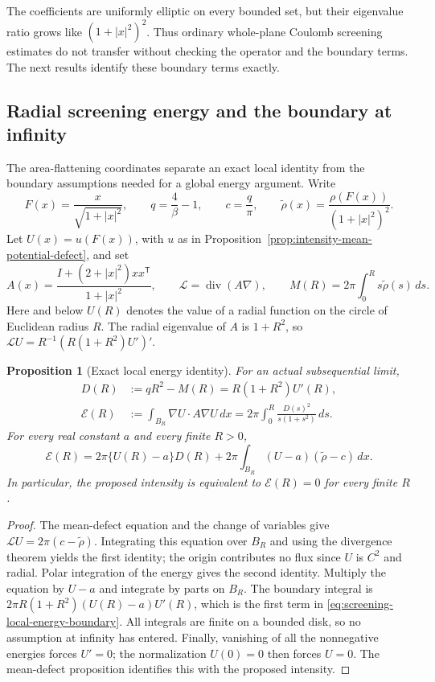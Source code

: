 \documentclass[11pt,a4paper]{article}
\numberwithin{equation}{section}
\newtheorem{proposition}[theorem]{Proposition}
\theoremstyle{definition}
\theoremstyle{remark}
\begin{document}
The coefficients are uniformly elliptic on every bounded set, but
their eigenvalue ratio grows like $(1+|x|^2)^2$.  Thus ordinary
whole-plane Coulomb screening estimates do not transfer without
checking the operator and the boundary terms.  The next results
identify these boundary terms exactly.


\subsection{Radial screening energy and the boundary at infinity}
\label{subsec:screening-boundary-energy}

The area-flattening coordinates separate an exact local identity from
the boundary assumptions needed for a global energy argument.  Write
\[
 F(x)=\frac{x}{\sqrt{1+|x|^2}},\qquad
 q=\frac4\beta-1,\qquad c=\frac q\pi,
 \qquad \widetilde\rho(x)=\frac{\rho(F(x))}{(1+|x|^2)^2}.
\]
Let $U(x)=u(F(x))$, with $u$ as in
Proposition~\ref{prop:intensity-mean-potential-defect}, and set
\[
 A(x)=\frac{I+(2+|x|^2)xx^{\mathsf T}}{1+|x|^2},\qquad
 \mathcal L=\operatorname{div}(A\nabla),\qquad
 M(R)=2\pi\int_0^R s\widetilde\rho(s)\,ds.
\]
Here and below $U(R)$ denotes the value of a radial function on the
circle of Euclidean radius $R$.  The radial eigenvalue of $A$ is
$1+R^2$, so $\mathcal LU=R^{-1}(R(1+R^2)U')'$.

\begin{proposition}[Exact local energy identity]
\label{prop:screening-local-energy}
For an actual subsequential limit,
\begin{align}
 D(R)&:=qR^2-M(R)=R(1+R^2)U'(R),
 \label{eq:screening-discrepancy-flux}\\
 \mathcal E(R)&:=\int_{B_R}\nabla U\cdot A\nabla U\,dx
       =2\pi\int_0^R\frac{D(s)^2}{s(1+s^2)}\,ds.
 \label{eq:screening-radial-energy}
\end{align}
For every real constant $a$ and every finite $R>0$,
\begin{equation}
 \mathcal E(R)=2\pi\{U(R)-a\}D(R)
       +2\pi\int_{B_R}(U-a)(\widetilde\rho-c)\,dx.
 \label{eq:screening-local-energy-boundary}
\end{equation}
In particular, the proposed intensity is equivalent to
$\mathcal E(R)=0$ for every finite $R$.
\end{proposition}

\begin{proof}
The mean-defect equation and the change of variables give
$\mathcal LU=2\pi(c-\widetilde\rho)$.  Integrating this equation
over $B_R$ and using the divergence theorem yields the first identity;
the origin contributes no flux since $U$ is $C^2$ and radial.
Polar integration of the energy gives the second identity.
Multiply the equation by $U-a$ and integrate by parts on $B_R$.
The boundary integral is
$2\pi R(1+R^2)(U(R)-a)U'(R)$, which is the first term in
\eqref{eq:screening-local-energy-boundary}.  All integrals are finite
on a bounded disk, so no assumption at infinity has entered.
Finally, vanishing of all the nonnegative energies forces $U'=0$;
the normalization $U(0)=0$ then forces $U=0$.  The mean-defect
proposition identifies this with the proposed intensity.
\end{proof}
\end{document}
